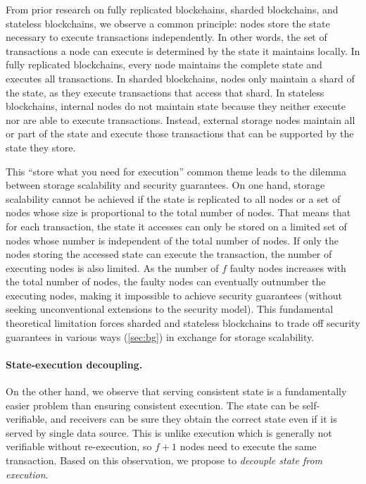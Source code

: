 
From prior research on fully replicated blockchains, sharded blockchains, and stateless blockchains, we observe a common principle: nodes store the state necessary to execute transactions independently.
In other words, the set of transactions a node can execute is determined by the state it maintains locally.
In fully replicated blockchains, every node maintains the complete state and executes all transactions.
In sharded blockchains, nodes only maintain a shard of the state, as they execute transactions that access that shard.
In stateless blockchains, internal nodes do not maintain state because they neither execute nor are able to execute transactions.
Instead, external storage nodes maintain all or part of the state and execute those transactions that can be supported by the state they store.

This ``store what you need for execution'' common theme leads to the dilemma between storage scalability and security guarantees.
On one hand, storage scalability cannot be achieved if the state is replicated to all nodes or a set of nodes whose size is proportional to the total number of nodes.
That means that for each transaction, the state it accesses can only be stored on a limited set of nodes whose number is independent of the total number of nodes.
If only the nodes storing the accessed state can execute the transaction, the number of executing nodes is also limited.
As the number of $f$ faulty nodes increases with the total number of nodes, the faulty nodes can eventually outnumber the executing nodes, making it impossible to achieve security guarantees (without seeking unconventional extensions to the security model).
This fundamental theoretical limitation forces sharded and stateless blockchains to trade off security guarantees in various ways (\cref{sec:bg}) in exchange for storage scalability.

\paragraph{State-execution decoupling.}
On the other hand, we observe that serving consistent state is a fundamentally easier problem than ensuring consistent execution.
The state can be self-verifiable, and receivers can be sure they obtain the correct state even if it is served by single data source.
This is unlike execution which is generally not verifiable without re-execution, so $f+1$ nodes need to execute the same transaction.
Based on this observation, we propose to \emph{decouple state from execution}.

